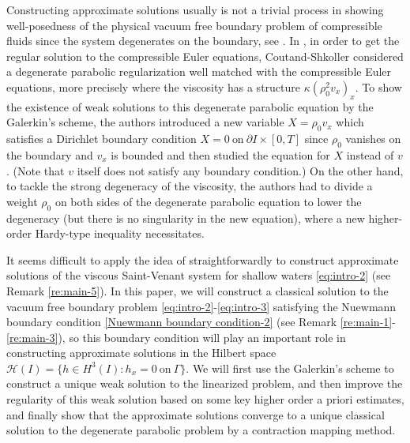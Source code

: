 \documentclass[11pt, reqno]{amsart}
\numberwithin{equation}{section}
\begin{document}
Constructing approximate solutions usually is not a trivial process in showing well-posedness of the physical vacuum free boundary problem of compressible fluids since the system degenerates on the boundary, see \cite{MR2547977, MR2779087, MR2980528, MR3280249}.
 In \cite{MR2779087}, in order to get the regular solution to the compressible Euler equations, Coutand-Shkoller considered a degenerate parabolic regularization well matched with the compressible Euler equations, more precisely where the viscosity has a structure \(\kappa(\rho_0^2v_x)_x\). To show the existence of weak solutions to this degenerate parabolic equation by the Galerkin's scheme, the authors introduced a new variable \(X=\rho_0v_x\) which satisfies a Dirichlet boundary condition
\(X=0\ \text{on}\ \partial I\times [0,T]\) since \(\rho_0\) vanishes on the boundary and \(v_x\) is bounded and then studied the equation for \(X\) instead of \(v\).
(Note that \(v\) itself does not satisfy any boundary condition.) On the other hand, to tackle the strong degeneracy of the viscosity, the authors had to divide a weight \(\rho_0\) on both sides of the degenerate parabolic equation to lower the degeneracy (but there is no singularity in the new equation), where a new higher-order Hardy-type inequality necessitates.

It seems difficult to apply the idea of \cite{MR2779087} straightforwardly to construct approximate solutions of the viscous Saint-Venant system for shallow waters \eqref{eq:intro-2} (see Remark \ref{re:main-5}). 
In this paper, we will construct a classical solution to the vacuum free boundary problem \eqref{eq:intro-2}-\eqref{eq:intro-3} satisfying the Nuewmann boundary condition \eqref{Nuewmann boundary condition-2} (see Remark \ref{re:main-1}-\ref{re:main-3}), so this boundary condition will play an important role in constructing approximate solutions in the Hilbert space \(\mathcal{H}(I)=\{h\in H^3(I): h_x=0 \ \text{on}\ \Gamma \}\). We will first use the Galerkin's scheme to
construct a unique weak solution to the linearized problem, and then improve the regularity of this weak solution based on some key higher order a priori estimates, and finally show  that the approximate solutions converge to a unique classical solution to the degenerate parabolic problem by a contraction mapping method. 
\end{document}
